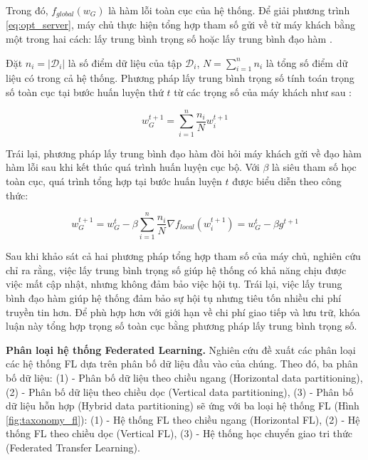 Trong đó, $f_{global}(w_G)$ là hàm lỗi toàn cục của hệ thống. Để giải phương trình \ref{eq:opt_server}, máy chủ thực hiện tổng hợp tham số gửi về từ máy khách bằng một trong hai cách: lấy trung bình trọng số \parencite{mcmahan2017communication, aono2017privacy, yoon2021fedmix} hoặc lấy trung bình đạo hàm \parencite{chen2018federated, mcmahan2017learning}.

Đặt $n_i = |\mathcal{D}_i|$ là số điểm dữ liệu của tập $\mathcal{D}_i$, $N = \sum_{i=1}^n{n_i}$ là tổng số điểm dữ liệu có trong cả hệ thống. Phương pháp lấy trung bình trọng số tính toán trọng số toàn cục tại bước huấn luyện thứ $t$ từ các trọng số của máy khách như sau \cite{mcmahan2017communication}:

\begin{equation}
    \label{eq:agg_w}
    w_G^{t+1} = \sum_{i=1}^n{\frac{n_i}{N} w_i^{t+1}}
\end{equation}

Trái lại, phương pháp lấy trung bình đạo hàm đòi hỏi máy khách gửi về đạo hàm hàm lỗi sau khi kết thúc quá trình huấn luyện cục bộ. Với $\beta$ là siêu tham số học toàn cục, quá trình tổng hợp tại bước huấn luyện $t$ được biểu diễn theo công thức:

\begin{dmath}
    w_G^{t+1} = w_G^t - \beta  \sum_{i=1}^n{\frac{n_i}{N} \nabla f_{local}(w_i^{t+1})}
        = w_G^t - \beta g^{t+1}
\end{dmath}

Sau khi khảo sát cả hai phương pháp tổng hợp tham số của máy chủ, nghiên cứu \cite{yin2021comprehensive} chỉ ra rằng, việc lấy trung bình trọng số giúp hệ thống có khả năng chịu được việc mất cập nhật, nhưng không đảm bảo việc hội tụ. Trái lại, việc lấy trung bình đạo hàm giúp hệ thống đảm bảo sự hội tụ nhưng tiêu tốn nhiều chi phí truyền tin hơn. Để phù hợp hơn với giới hạn về chi phí giao tiếp và lưu trữ, khóa luận này tổng hợp trọng số toàn cục bằng phương pháp lấy trung bình trọng số.

\textbf{Phân loại hệ thống Federated Learning.} Nghiên cứu \cite{yin2021comprehensive} đề xuất các phân loại các hệ thống FL dựa trên phân bố dữ liệu đầu vào của chúng. Theo đó, ba phân bố dữ liệu: (1) - Phân bố dữ liệu theo chiều ngang (Horizontal data partitioning), (2) - Phân bố dữ liệu theo chiều dọc (Vertical data partitioning), (3) - Phân bố dữ liệu hỗn hợp (Hybrid data partitioning) sẽ ứng với ba loại hệ thống FL (Hình \ref{fig:taxonomy_fl}): (1) - Hệ thống FL theo chiều ngang (Horizontal FL), (2) - Hệ thống FL theo chiều dọc (Vertical FL), (3) - Hệ thống học chuyển giao tri thức (Federated Transfer Learning).

